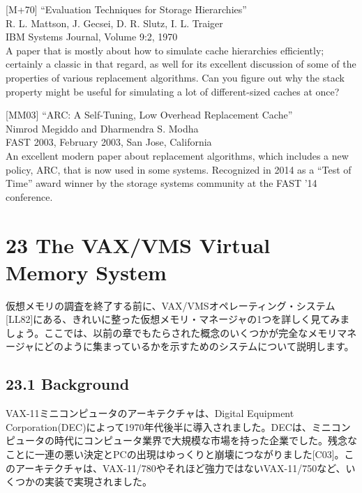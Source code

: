{[}M+70{]} ``Evaluation Techniques for Storage Hierarchies''\\
R. L. Mattson, J. Gecsei, D. R. Slutz, I. L. Traiger\\
IBM Systems Journal, Volume 9:2, 1970\\
A paper that is mostly about how to simulate cache hierarchies
efficiently; certainly a classic in that regard, as well for its
excellent discussion of some of the properties of various replacement
algorithms. Can you figure out why the stack property might be useful
for simulating a lot of different-sized caches at once?

{[}MM03{]} ``ARC: A Self-Tuning, Low Overhead Replacement Cache''\\
Nimrod Megiddo and Dharmendra S. Modha\\
FAST 2003, February 2003, San Jose, California\\
An excellent modern paper about replacement algorithms, which includes a
new policy, ARC, that is now used in some systems. Recognized in 2014 as
a ``Test of Time'' award winner by the storage systems community at the
FAST '14 conference.

\newpage

\hypertarget{the-vaxvms-virtual-memory-system}{%
\section*{23 The VAX/VMS Virtual Memory
System}\label{the-vaxvms-virtual-memory-system}}

仮想メモリの調査を終了する前に、VAX/VMSオペレーティング・システム{[}LL82{]}にある、きれいに整った仮想メモリ・マネージャの1つを詳しく見てみましょう。ここでは、以前の章でもたらされた概念のいくつかが完全なメモリマネージャにどのように集まっているかを示すためのシステムについて説明します。

\hypertarget{background}{%
\subsection*{23.1 Background}\label{background}}

VAX-11ミニコンピュータのアーキテクチャは、Digital Equipment
Corporation(DEC)によって1970年代後半に導入されました。DECは、ミニコンピュータの時代にコンピュータ業界で大規模な市場を持った企業でした。残念なことに一連の悪い決定とPCの出現はゆっくりと崩壊につながりました{[}C03{]}。このアーキテクチャは、VAX-11/780やそれほど強力ではないVAX-11/750など、いくつかの実装で実現されました。

